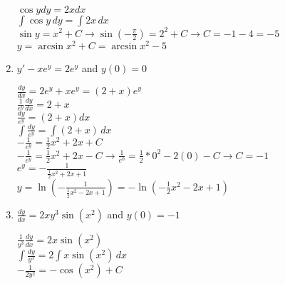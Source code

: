 \documentclass[10pt,letterpaper]{report}
\begin{document}
\begin{enumerate}
    $\cos{y}dy = 2xdx$ \\
    
    $\int{\cos{y}}\,dy=\int{2x}\,dx$ \\
    
    $\sin{y}=x^{2}+C\rightarrow \sin{\left(-\frac{\pi}{2}\right)}=2^{2}+C\rightarrow C=-1-4=-5$ \\
    
    $y=\arcsin{x^{2}+C}=\arcsin{x^{2}-5}$ \\
    
    \pagebreak
    
  \item{$y'-xe^{y}=2e^{y}$ and $y(0)=0$ \\}
  
    $\frac{dy}{dx}=2e^{y}+xe^{y}=\left(2+x\right)e^{y}$ \\
    
    $\frac{1}{e^{y}}\frac{dy}{dx}=2+x$ \\
    
    $\frac{dy}{e^{y}}=\left(2+x\right)dx$ \\
    
    $\int{\frac{dy}{e^{y}}}=\int{\left(2+x\right)\,dx}$ \\
    
    $-\frac{1}{e^{y}}=\frac{1}{2}x^{2}+2x+C$ \\
    
    $-\frac{1}{e^{y}}=\frac{1}{2}x^{2}+2x-C\rightarrow \frac{1}{e^{0}}=\frac{1}{2}*0^{2}-2(0)-C\rightarrow C=-1$ \\
    
    $e^{y}=-\frac{1}{\frac{1}{2}x^{2}+2x+1}$ \\
    
    $y=\ln{\left(-\frac{1}{\frac{1}{2}x^{2}-2x+1}\right)}=-\ln{\left(-\frac{1}{2}x^{2}-2x+1\right)}$ \\
    
  \item{$\frac{dy}{dx}=2xy^{3}\sin{\left(x^{2}\right)}$ and $y(0)=-1$ \\}
  
    $\frac{1}{y^{3}}\frac{dy}{dx}=2x\sin{\left(x^{2}\right)}$ \\
    
    $\int{\frac{dy}{y^{3}}}=2\int{x\sin{\left(x^{2}\right)}}\,dx$ \\
    
    $-\frac{1}{2y^{2}}=-\cos{\left(x^{2}\right)}+C$ \\
    

\end{enumerate}
\end{document}
